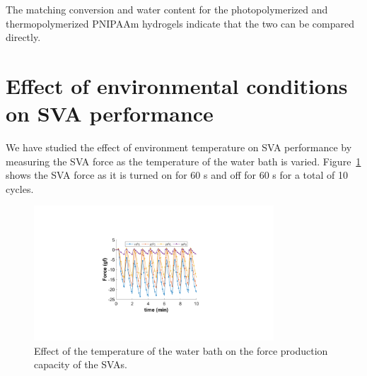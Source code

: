 The matching conversion and water content for the photopolymerized and thermopolymerized PNIPAAm hydrogels indicate that the two can be compared directly.

\section{Effect of environmental conditions on SVA performance}
We have studied the effect of environment temperature on SVA performance by measuring the SVA force as the temperature of the water bath is varied. Figure~\ref{fig:envTemp} shows the SVA force as it is turned on for 60 s and off for 60 s for a total of 10 cycles.
\begin{figure}[!ht]
      \centering
      \includegraphics[width=0.8\textwidth]{envTemp.pdf}
      \caption[Effect of environment temperature]{Effect of the temperature of the water bath on the force production capacity of the SVAs.}
      \label{fig:envTemp}
\end{figure}

